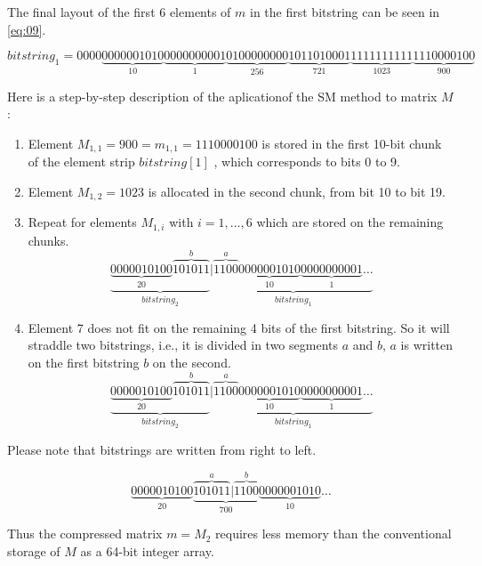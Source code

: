 \documentclass[10pt]{article}
\begin{document}
The final layout of the first 6 elements of $m$ in the first bitstring can be seen in \ref{eq:09}.

\begin{equation}\label{eq:09}
 bitstring_1 = 0000\underbrace{0000001010}_{10}\underbrace{0000000001}_{1}\underbrace{0100000000}_{256}\underbrace{1011010001}_{721}\underbrace{1111111111}_{1023}\underbrace{1110000100}_{900} 
\end{equation}

Here is a step-by-step description of the aplicationof the SM method to matrix $M$:
\begin{enumerate}
 \item Element $M_{1,1}=900 = m_{1,1} = 1110000100$ is stored in the first 10-bit chunk of the element strip $bitstring[1]$ , which corresponds to bits 0 to 9.
 \item Element $M_{1,2}=1023$ is allocated in the second chunk, from bit 10 to bit 19.
 \item Repeat for elements $M_{1,i}$ with $i=1,\ldots,6$ which are stored on the remaining chunks.
 \begin{equation*}\label{eq:10}
  \underbrace{\underbrace{0000010100}_{20}\overbrace{101011}^{b}}_{bitstring_2}|\underbrace{\overbrace{1100}^{a}\underbrace{0000001010}_{10}\underbrace{0000000001}_{1}\hdots}_{bitstring_1}
\end{equation*}
 \item Element 7 does not fit on the remaining 4 bits of the first bitstring. So it will straddle two bitstrings, i.e., it is divided in two segments $a$ and $b$, $a$ is written on the first bitstring $b$ on the second.
 \begin{equation*}\label{eq:10}
  \underbrace{\underbrace{0000010100}_{20}\overbrace{101011}^{b}}_{bitstring_2}|\underbrace{\overbrace{1100}^{a}\underbrace{0000001010}_{10}\underbrace{0000000001}_{1}\hdots}_{bitstring_1}
\end{equation*}
\end{enumerate}


 Please note that bitstrings are written from right to left.



\begin{equation*}\label{eq:11}
  \underbrace{0000010100}_{20}\underbrace{\overbrace{101011}^a|\overbrace{1100}^{b}}_{700}\underbrace{0000001010}_{10}\ldots
\end{equation*}

Thus the compressed matrix $m = M_2$ requires less memory than the conventional storage of $M$ as a 64-bit integer array.
\end{document}
